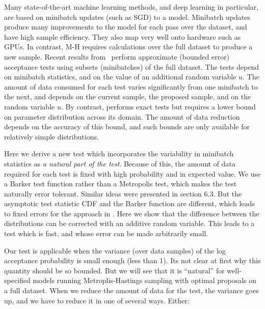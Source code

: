\documentclass{article}
\begin{document}
Many state-of-the-art machine learning methods, and deep learning in
particular, are based on minibatch updates (such as SGD) to a model.
Minibatch updates produce many improvements to the model for each pass
over the dataset, and have high sample efficiency. They also
map very well onto hardware such as GPUs. In contrast, M-H requires
calculations over the full dataset to produce a new sample.  Recent
results from~\cite{cutting_mh_2014,icml2014c1_bardenet14} perform
approximate (bounded error) acceptance tests using subsets
(minibatches) of the full dataset. The tests depend on minibatch
statistics, and on the value of an additional random variable $u$. The
amount of data consumed for each test varies significantly from one
minibatch to the next, and depends on the current sample, the proposed
sample, and on the random variable $u$. By contrast,
\cite{conf/uai/MaclaurinA14} performs exact tests but requires a lower
bound on parameter distribution across its domain. The amount of data
reduction depends on the accuracy of this bound, and such bounds are
only available for relatively simple distributions.

Here we derive a new test which incorporates the variability in
minibatch statistics as {\em a natural part of the test}. Because of
this, the amount of data required for each test is fixed with high
probability and in expected value. We use a Barker
test function \cite{Barker65} rather than a Metropolis test, which
makes the test naturally error tolerant. Similar ideas were presented
in \cite{Bardenet15} section 6.3. But the asymptotic test statistic
CDF and the Barker function are different, which leads to fixed
errors for the approach in \cite{Bardenet15}. Here we show that the
difference between the distributions can be corrected with an
additive random variable. This leads to a test which is fast, and
whose error can be made arbitrarily small.

Our test is applicable when the variance (over data samples) of the
log acceptance probability is small enough (less than 1). Its not
clear at first why this quantity should be so bounded. But we will see
that it is ``natural'' for well-specified models running
Metroplis-Hastings sampling with optimal proposals
\cite{OptimalScaling01} on a full dataset. When we reduce the amount
of data for the test, the variance goes up, and we have to reduce
it in one of several ways. Either:
\end{document}
